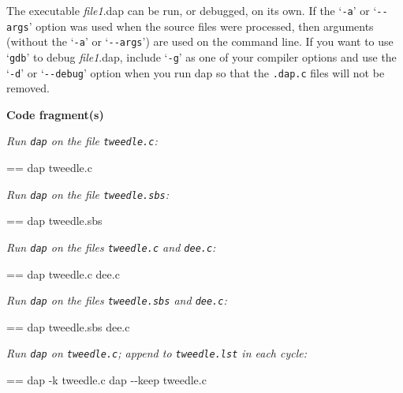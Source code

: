\documentclass{book}
\makeatletter
\newcommand\Texinfocommandstyletextvar[1]{{\normalfont{}\textsl{#1}}}%
\newenvironment{Texinfopreformatted}{%
  \par\GNUTobeylines\obeyspaces\frenchspacing\parskip=\z@\parindent=\z@}{}
{\catcode`\^^M=13 \gdef\GNUTobeylines{\catcode`\^^M=13 \def^^M{\null\par}}}
\newenvironment{Texinfoindented}{\begin{list}{}{}\item\relax}{\end{list}}
\renewcommand{\_}{\Texinfounderscore\discretionary{}{}{}}
\makeatother
\begin{document}
The executable \Texinfocommandstyletextvar{file1}.dap can be run, or debugged,
%
on its own.
If the `\texttt{-a}' or `\texttt{{-}{-}args}'
%
%
option was used when the source files were processed, then arguments
%
(without the `\texttt{-a}' or `\texttt{{-}{-}args}') are used on the command line.
If you want to use `\texttt{gdb}'
to debug \Texinfocommandstyletextvar{file1}.dap, include `\texttt{-g}' as one
of your compiler options and use the `\texttt{-d}' or `\texttt{{-}{-}debug}' option when you run
dap so that the \texttt{.dap.c} files will not be removed.

\noindent{}\textbf{Code fragment(s)}

\emph{Run \texttt{dap} on the file \texttt{tweedle.c}:}
\begin{Texinfoindented}
\begin{Texinfopreformatted}%
\ttfamily dap tweedle.c
\end{Texinfopreformatted}
\end{Texinfoindented}

\emph{Run \texttt{dap} on the file \texttt{tweedle.sbs}:}
\begin{Texinfoindented}
\begin{Texinfopreformatted}%
\ttfamily dap tweedle.sbs
\end{Texinfopreformatted}
\end{Texinfoindented}

\emph{Run \texttt{dap} on the files \texttt{tweedle.c} and \texttt{dee.c}:}
\begin{Texinfoindented}
\begin{Texinfopreformatted}%
\ttfamily dap tweedle.c dee.c
\end{Texinfopreformatted}
\end{Texinfoindented}

\emph{Run \texttt{dap} on the files \texttt{tweedle.sbs} and \texttt{dee.c}:}
\begin{Texinfoindented}
\begin{Texinfopreformatted}%
\ttfamily dap tweedle.sbs dee.c
\end{Texinfopreformatted}
\end{Texinfoindented}

\emph{Run \texttt{dap} on \texttt{tweedle.c}; append to \texttt{tweedle.lst} in each cycle:}
\begin{Texinfoindented}
\begin{Texinfopreformatted}%
\ttfamily dap -k tweedle.c
dap {-}{-}keep tweedle.c
\end{Texinfopreformatted}
\end{Texinfoindented}
\end{document}
